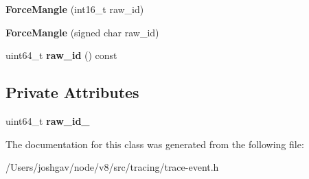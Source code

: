 \begin{DoxyCompactItemize}
\item 
{\bfseries Force\+Mangle} (int16\+\_\+t raw\+\_\+id)\hypertarget{classv8_1_1internal_1_1tracing_1_1_trace_i_d_1_1_force_mangle_a85c44b400d7e54b08702395a33a7cb76}{}\label{classv8_1_1internal_1_1tracing_1_1_trace_i_d_1_1_force_mangle_a85c44b400d7e54b08702395a33a7cb76}

\item 
{\bfseries Force\+Mangle} (signed char raw\+\_\+id)\hypertarget{classv8_1_1internal_1_1tracing_1_1_trace_i_d_1_1_force_mangle_a89c6aa5a92c88f1d8b42f744af1d21c6}{}\label{classv8_1_1internal_1_1tracing_1_1_trace_i_d_1_1_force_mangle_a89c6aa5a92c88f1d8b42f744af1d21c6}

\item 
uint64\+\_\+t {\bfseries raw\+\_\+id} () const \hypertarget{classv8_1_1internal_1_1tracing_1_1_trace_i_d_1_1_force_mangle_ae7d9f9b1c516e2b6e85e1fb744930c69}{}\label{classv8_1_1internal_1_1tracing_1_1_trace_i_d_1_1_force_mangle_ae7d9f9b1c516e2b6e85e1fb744930c69}

\end{DoxyCompactItemize}
\subsection*{Private Attributes}
\begin{DoxyCompactItemize}
\item 
uint64\+\_\+t {\bfseries raw\+\_\+id\+\_\+}\hypertarget{classv8_1_1internal_1_1tracing_1_1_trace_i_d_1_1_force_mangle_a80c2557c6df3f680420452e6b86fe509}{}\label{classv8_1_1internal_1_1tracing_1_1_trace_i_d_1_1_force_mangle_a80c2557c6df3f680420452e6b86fe509}

\end{DoxyCompactItemize}


The documentation for this class was generated from the following file\+:\begin{DoxyCompactItemize}
\item 
/\+Users/joshgav/node/v8/src/tracing/trace-\/event.\+h\end{DoxyCompactItemize}
